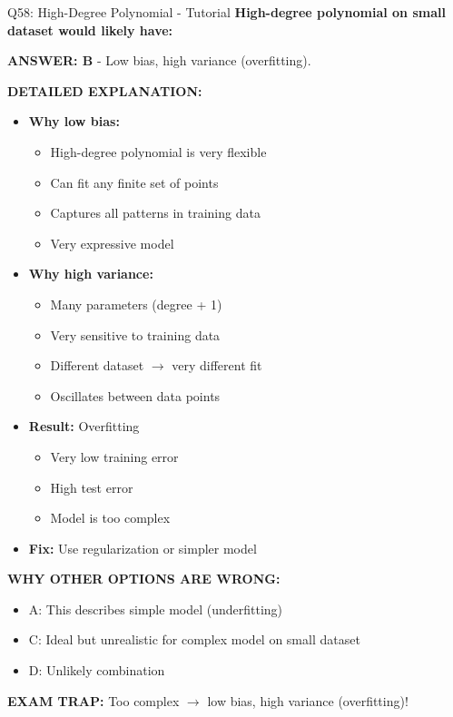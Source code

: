 \documentclass[8pt]{beamer}
\begin{document}
	\begin{frame}{Q58: High-Degree Polynomial - Tutorial}
		\fontsize{6.5}{7.5}\selectfont
		\textbf{High-degree polynomial on small dataset would likely have:}
		
		\vspace{0.05cm}
		\textcolor{myblue}{\textbf{ANSWER: B}} - Low bias, high variance (overfitting).
		
		\vspace{0.05cm}
		\textbf{DETAILED EXPLANATION:}
		\begin{itemize}
			\item \textbf{Why low bias:}
			\begin{itemize}
				\item High-degree polynomial is very flexible
				\item Can fit any finite set of points
				\item Captures all patterns in training data
				\item Very expressive model
			\end{itemize}
			\item \textbf{Why high variance:}
			\begin{itemize}
				\item Many parameters (degree + 1)
				\item Very sensitive to training data
				\item Different dataset $\to$ very different fit
				\item Oscillates between data points
			\end{itemize}
			\item \textbf{Result:} Overfitting
			\begin{itemize}
				\item Very low training error
				\item High test error
				\item Model is too complex
			\end{itemize}
			\item \textbf{Fix:} Use regularization or simpler model
		\end{itemize}
		
		\vspace{0.05cm}
		\textcolor{myred}{\textbf{WHY OTHER OPTIONS ARE WRONG:}}
		\begin{itemize}
			\item \textcolor{myred}{A:} This describes simple model (underfitting)
			\item \textcolor{myred}{C:} Ideal but unrealistic for complex model on small dataset
			\item \textcolor{myred}{D:} Unlikely combination
		\end{itemize}
		
		\textcolor{myred}{\textbf{EXAM TRAP:}} Too complex $\to$ low bias, high variance (overfitting)!
	\end{frame}
	
\end{document}
